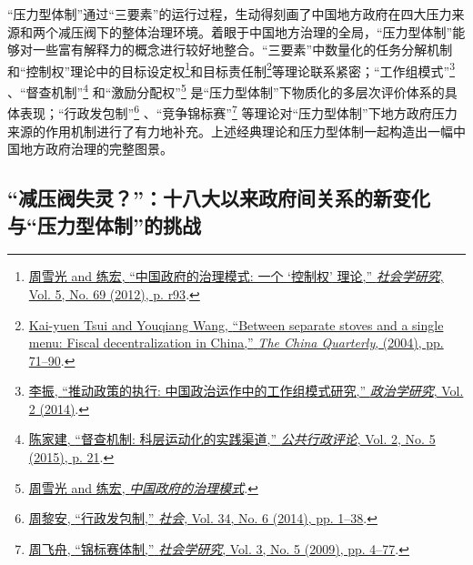 \documentclass[
  12pt,
]{ctexart}
\begin{document}
``压力型体制''通过``三要素''的运行过程，生动得刻画了中国地方政府在四大压力来源和两个减压阀下的整体治理环境。着眼于中国地方治理的全局，``压力型体制''能够对一些富有解释力的概念进行较好地整合。``三要素''中数量化的任务分解机制和``控制权''理论中的目标设定权\footnote{\protect\hyperlink{ref-ZhouXueGuangLianHong2012}{周雪光 and 练宏, {``中国政府的治理模式: 一个 {`控制权'} 理论,''} \emph{社会学研究}, Vol. 5, No. 69 (2012), p. r93}.}和目标责任制\footnote{\protect\hyperlink{ref-TsuiWang2004}{Kai-yuen Tsui and Youqiang Wang, {``Between separate stoves and a single menu: Fiscal decentralization in {China},''} \emph{The China Quarterly}, (2004), pp. 71--90}.}等理论联系紧密；``工作组模式''\footnote{\protect\hyperlink{ref-LiZhen2014}{李振, {``推动政策的执行: 中国政治运作中的工作组模式研究,''} \emph{政治学研究}, Vol. 2 (2014)}.} 、``督查机制''\footnote{\protect\hyperlink{ref-ChenJiaJian2015}{陈家建, {``督查机制: 科层运动化的实践渠道,''} \emph{公共行政评论}, Vol. 2, No. 5 (2015), p. 21}.} 和``激励分配权''\footnote{\protect\hyperlink{ref-ZhouXueGuangLianHong2012}{周雪光 and 练宏, \emph{中国政府的治理模式}}.} 是``压力型体制''下物质化的多层次评价体系的具体表现；``行政发包制''\footnote{\protect\hyperlink{ref-ZhouLiAn2014a}{周黎安, {``行政发包制,''} \emph{社会}, Vol. 34, No. 6 (2014), pp. 1--38}.} 、``竞争锦标赛''\footnote{\protect\hyperlink{ref-ZhouFeiZhou2009}{周飞舟, {``锦标赛体制,''} \emph{社会学研究}, Vol. 3, No. 5 (2009), pp. 4--77}.} 等理论对``压力型体制''下地方政府压力来源的作用机制进行了有力地补充。上述经典理论和压力型体制一起构造出一幅中国地方政府治理的完整图景。

\hypertarget{ux51cfux538bux9600ux5931ux7075ux5341ux516bux5927ux4ee5ux6765ux653fux5e9cux95f4ux5173ux7cfbux7684ux65b0ux53d8ux5316ux4e0eux538bux529bux578bux4f53ux5236ux7684ux6311ux6218}{%
\subsection{``减压阀失灵？''：十八大以来政府间关系的新变化与``压力型体制''的挑战}\label{ux51cfux538bux9600ux5931ux7075ux5341ux516bux5927ux4ee5ux6765ux653fux5e9cux95f4ux5173ux7cfbux7684ux65b0ux53d8ux5316ux4e0eux538bux529bux578bux4f53ux5236ux7684ux6311ux6218}}
\end{document}
